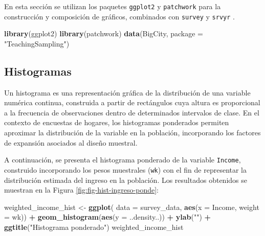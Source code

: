\documentclass[
  spanish,
  12pt,
]{book}
\newenvironment{Shaded}{\begin{snugshade}}{\end{snugshade}}
\newcommand{\AttributeTok}[1]{\textcolor[rgb]{0.13,0.29,0.53}{#1}}
\newcommand{\FunctionTok}[1]{\textcolor[rgb]{0.13,0.29,0.53}{\textbf{#1}}}
\newcommand{\NormalTok}[1]{#1}
\newcommand{\OtherTok}[1]{\textcolor[rgb]{0.56,0.35,0.01}{#1}}
\newcommand{\SpecialCharTok}[1]{\textcolor[rgb]{0.81,0.36,0.00}{\textbf{#1}}}
\newcommand{\StringTok}[1]{\textcolor[rgb]{0.31,0.60,0.02}{#1}}
\begin{document}
En esta sección se utilizan los paquetes \texttt{ggplot2} \citep{ggplot22026} y \texttt{patchwork} \citep{patchwork} para la construcción y composición de gráficos, combinados con \texttt{survey} \citep{Lumley2024} y \texttt{srvyr} \citep{Freedman2024}.

\begin{Shaded}
\begin{Highlighting}[]
\FunctionTok{library}\NormalTok{(ggplot2)}
\FunctionTok{library}\NormalTok{(patchwork)}
\FunctionTok{data}\NormalTok{(BigCity, }\AttributeTok{package =} \StringTok{"TeachingSampling"}\NormalTok{)}
\end{Highlighting}
\end{Shaded}

\subsection{Histogramas}\label{histogramas}

Un histograma es una representación gráfica de la distribución de una variable numérica continua, construida a partir de rectángulos cuya altura es proporcional a la frecuencia de observaciones dentro de determinados intervalos de clase. En el contexto de encuestas de hogares, los histogramas ponderados permiten aproximar la distribución de la variable en la población, incorporando los factores de expansión asociados al diseño muestral.

A continuación, se presenta el histograma ponderado de la variable \texttt{Income}, construido incorporando los pesos muestrales (\texttt{wk}) con el fin de representar la distribución estimada del ingreso en la población. Los resultados obtenidos se muestran en la Figura \ref{fig:fig-hist-ingreso-ponde}:

\begin{Shaded}
\begin{Highlighting}[]
\NormalTok{weighted\_income\_hist }\OtherTok{\textless{}{-}} \FunctionTok{ggplot}\NormalTok{(}
  \AttributeTok{data =}\NormalTok{ survey\_data,}
  \FunctionTok{aes}\NormalTok{(}\AttributeTok{x =}\NormalTok{ Income, }\AttributeTok{weight =}\NormalTok{ wk)) }\SpecialCharTok{+}
  \FunctionTok{geom\_histogram}\NormalTok{(}\FunctionTok{aes}\NormalTok{(}\AttributeTok{y =}\NormalTok{ ..density..)) }\SpecialCharTok{+}
  \FunctionTok{ylab}\NormalTok{(}\StringTok{""}\NormalTok{) }\SpecialCharTok{+}
  \FunctionTok{ggtitle}\NormalTok{(}\StringTok{"Histograma ponderado"}\NormalTok{)}
\NormalTok{weighted\_income\_hist}
\end{Highlighting}
\end{Shaded}
\end{document}
